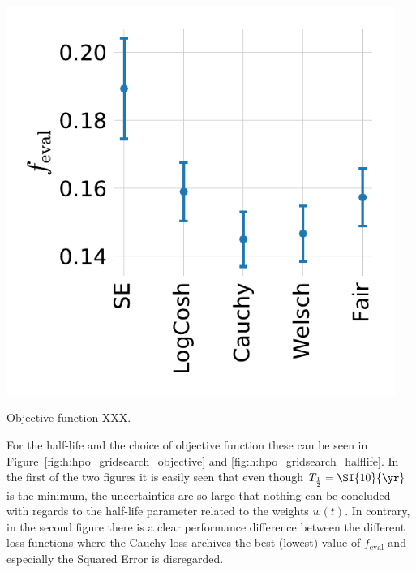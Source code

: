 \begin{marginfigure}[1cm]
  \centerfloat
  \includegraphics[width=0.95\textwidth, trim=0 0 0 0, clip]{figures/housing/Ejerlejlighed_v19_cut_all_Ncols_all_MAD_gridsearch_obj.pdf}
  \caption[XXX]
          {Objective function XXX.
          } 
  \label{fig:h:hpo_gridsearch_halflife}
\end{marginfigure}
For the half-life and the choice of objective function these can be seen in Figure~\ref{fig:h:hpo_gridsearch_objective} and \ref{fig:h:hpo_gridsearch_halflife}. In the first of the two figures it is easily seen that even though $T_{\frac{1}{2}}=\SI{10}{\yr}$ is the minimum, the uncertainties are so large that nothing can be concluded with regards to the half-life parameter related to the weights $w(t)$. In contrary, in the second figure there is a clear performance difference between the different loss functions where the Cauchy loss archives the best (lowest) value of $f_\mathrm{eval}$ and especially the Squared Error is disregarded. 

